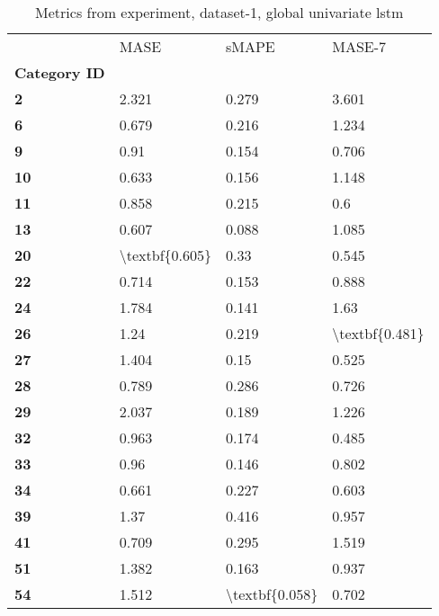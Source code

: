 \begin{table}[h]
\centering
\caption{Metrics from experiment, dataset-1, global univariate lstm}
\label{table:global-univariate-lstm-dataset-1}
\begin{tabular}{llll}
\toprule
{} &            MASE &           sMAPE &          MASE-7 \\
\textbf{Category ID} &                 &                 &                 \\
\midrule
\textbf{2          } &           2.321 &           0.279 &           3.601 \\
\textbf{6          } &           0.679 &           0.216 &           1.234 \\
\textbf{9          } &            0.91 &           0.154 &           0.706 \\
\textbf{10         } &           0.633 &           0.156 &           1.148 \\
\textbf{11         } &           0.858 &           0.215 &             0.6 \\
\textbf{13         } &           0.607 &           0.088 &           1.085 \\
\textbf{20         } &  \textbackslash textbf\{0.605\} &            0.33 &           0.545 \\
\textbf{22         } &           0.714 &           0.153 &           0.888 \\
\textbf{24         } &           1.784 &           0.141 &            1.63 \\
\textbf{26         } &            1.24 &           0.219 &  \textbackslash textbf\{0.481\} \\
\textbf{27         } &           1.404 &            0.15 &           0.525 \\
\textbf{28         } &           0.789 &           0.286 &           0.726 \\
\textbf{29         } &           2.037 &           0.189 &           1.226 \\
\textbf{32         } &           0.963 &           0.174 &           0.485 \\
\textbf{33         } &            0.96 &           0.146 &           0.802 \\
\textbf{34         } &           0.661 &           0.227 &           0.603 \\
\textbf{39         } &            1.37 &           0.416 &           0.957 \\
\textbf{41         } &           0.709 &           0.295 &           1.519 \\
\textbf{51         } &           1.382 &           0.163 &           0.937 \\
\textbf{54         } &           1.512 &  \textbackslash textbf\{0.058\} &           0.702 \\
\bottomrule
\end{tabular}
\end{table}
